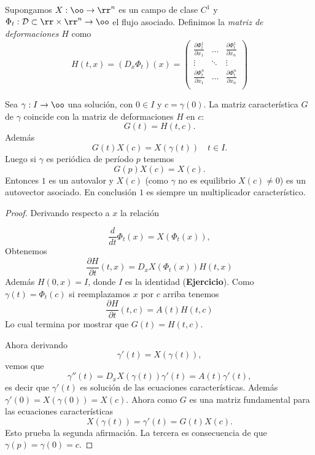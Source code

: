 \begin{definicion}Supongamos
  $X:\oo\to\rr^n$ es un campo de clase $C^1$ y $\Phi_t:\mathcal{D}\subset\rr\times\rr^n\to\oo$ el flujo asociado. 
 Definimos la \emph{matriz de deformaciones} $H$ como 
 \[H(t,x)=(D_x\Phi_t)(x)=\begin{pmatrix}
                        \frac{\partial\Phi^1_t}{\partial x_1 } &\dots & \frac{\partial\Phi^1_t}{\partial x_n}\\
                        \vdots  & \ddots & \vdots\\
                        \frac{\partial\Phi^n_t}{\partial x_1 }& \dots &\frac{\partial\Phi^n_t}{\partial x_n }\\ 
                       \end{pmatrix}
\]
\end{definicion}






 

\begin{teorema}Sea $\gamma:I\to\oo$ una solución, con $0\in I$ y $c=\gamma(0)$. La matriz característica 
$G$ de $\gamma$ coincide con la matriz de deformaciones $H$ en $c$:
\[G(t)=H(t,c).\]
Además
\[G(t)X(c)=X(\gamma(t))\quad t\in I.\]
Luego si $\gamma$ es periódica de período $p$ tenemos
\[G(p)X(c)=X(c).\]
Entonces $1$ es un autovalor y $X(c)$ (como $\gamma$ no es equilibrio $X(c)\neq 0$) es un autovector asociado.
En conclusión $1$ es siempre un multiplicador característico.
 
\end{teorema}



\begin{proof}
 Derivando respecto a $x$ la relación

\[\frac{d}{dt}\Phi_t(x)=X(\Phi_t(x)),\]
Obtenemos
\[\frac{\partial H}{\partial t}(t,x)=D_xX(\Phi_t(x))H(t,x)\]
Además $H(0,x)=I$, donde $I$ es la identidad (\textbf{Ejercicio}). Como $\gamma(t)=\Phi_t(c)$ si reemplazamos $x$
por $c$ arriba tenemos 
\[
 \frac{\partial H}{\partial t}(t,c)=A(t)H(t,c)
\]
Lo cual termina por mostrar que $G(t)=H(t,c)$. 


 Ahora derivando
 \[\gamma'(t)=X(\gamma(t)),\]
 vemos que
  \[\gamma''(t)=D_xX(\gamma(t))\gamma'(t)=A(t)\gamma'(t),\]
  es decir que $\gamma'(t)$ es solución de las ecuaciones características. Además $\gamma'(0)=X(\gamma(0))=X(c)$. 
  Ahora como $G$ es una matriz fundamental para las ecuaciones características
  \[X(\gamma(t))=\gamma'(t)=G(t)X(c).\]
  Esto prueba la segunda afirmación. La tercera es consecuencia de que $\gamma(p)=\gamma(0)=c$.
\end{proof}


